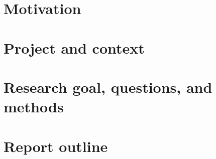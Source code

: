 \documentclass[../Main.tex]{subfiles}
\begin{document}
\section{Motivation}
\section{Project and context}
\section{Research goal, questions, and methods}
\section{Report outline}


\biblio %
\end{document}
